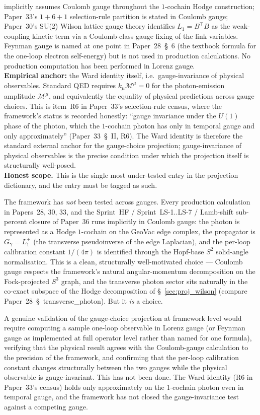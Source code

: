 \documentclass[11pt]{article}
\begin{document}
implicitly assumes Coulomb gauge throughout the $1$-cochain Hodge
construction; Paper~33's $1{+}6{+}1$ selection-rule partition is
stated in Coulomb gauge; Paper~30's SU(2) Wilson lattice gauge theory
identifies $L_1 = B^\top B$ as the weak-coupling kinetic term via a
Coulomb-class gauge fixing of the link variables.  Feynman gauge is
named at one point in Paper~28~\S~6 (the textbook formula for the
one-loop electron self-energy) but is not used in production
calculations.  No production computation has been performed in Lorenz
gauge.\\
\textbf{Empirical anchor:} the Ward identity itself, i.e.\
gauge-invariance of physical observables.  Standard QED requires
$k_\mu \mathcal{M}^\mu = 0$ for the photon-emission amplitude
$\mathcal{M}^\mu$, and equivalently the equality of physical
predictions across gauge choices.  This is item~R6 in Paper~33's
selection-rule census, where the framework's status is recorded
honestly: ``gauge invariance under the $U(1)$ phase of the photon,
which the $1$-cochain photon has only in temporal gauge and only
approximately'' (Paper~33~\S~II, R6).  The Ward identity is therefore
the standard external anchor for the gauge-choice projection;
gauge-invariance of physical observables is the precise condition
under which the projection itself is structurally well-posed.\\
\textbf{Honest scope.}  This is the single most under-tested entry in
the projection dictionary, and the entry must be tagged as such.

The framework has \emph{not} been tested across gauges.  Every
production calculation in Papers~28, 30, 33, and the Sprint~HF /
Sprint~LS-1..LS-7 / Lamb-shift sub-percent closure of Paper~36 runs
implicitly in Coulomb gauge: the photon is represented as a Hodge
$1$-cochain on the GeoVac edge complex, the propagator is
$G_\gamma = L_1^+$ (the transverse pseudoinverse of the edge
Laplacian), and the per-loop calibration constant $1/(4\pi)$ is
identified through the Hopf-base $S^2$ solid-angle normalisation.
This is a clean, structurally well-motivated choice ---  Coulomb gauge
respects the framework's natural angular-momentum decomposition on
the Fock-projected $S^3$ graph, and the transverse photon sector
sits naturally in the co-exact subspace of the Hodge decomposition
of \S~\ref{sec:proj_wilson} (compare Paper~28~\S~transverse\_photon).
But it \emph{is} a choice.

A genuine validation of the gauge-choice projection at framework level
would require computing a sample one-loop observable in Lorenz gauge
(or Feynman gauge as implemented at full operator level rather than
named for one formula), verifying that the physical result agrees
with the Coulomb-gauge calculation to the precision of the framework,
and confirming that the per-loop calibration constant changes
structurally between the two gauges while the physical observable is
gauge-invariant.  This has not been done.  The Ward identity (R6 in
Paper~33's census) holds only approximately on the $1$-cochain photon
even in temporal gauge, and the framework has not closed the
gauge-invariance test against a competing gauge.
\end{document}
